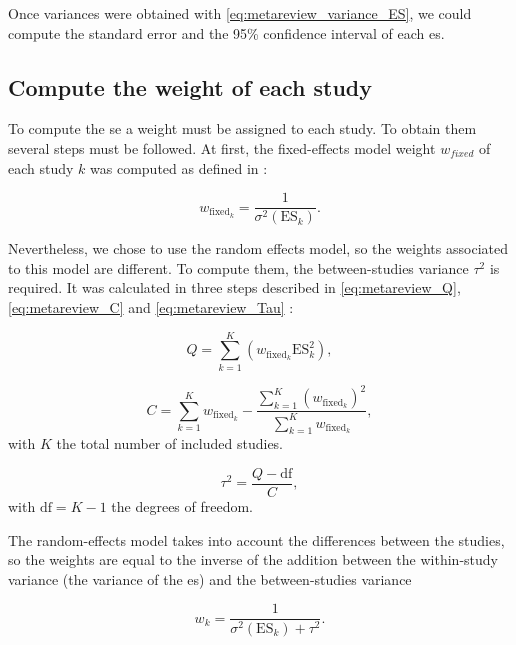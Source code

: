 \documentclass[12pt,a4paper,english]{article}
\begin{document}
Once variances were obtained with \ref{eq:metareview_variance_ES}, we could compute the standard error and the 95\% confidence interval of each \gls{es}. 

\subsection{Compute the weight of each study}

To compute the \gls{se} a weight must be assigned to each study. To obtain them several steps must be followed. At first, the fixed-effects model 
weight $w_{fixed}$ of each study $k$ was computed as defined in \citet{Borenstein2009}: 

\begin{equation}
\label{eq:metareview_weight_fixed_study}
w_{\text{fixed}_k} = \frac{1}{\sigma^2(\text{ES}_k)}.
\end{equation} 

Nevertheless, we chose to use the random effects model, so the weights associated to this model are different. To compute them, the between-studies 
variance $\tau^2$ is required. It was calculated in three steps described in \ref{eq:metareview_Q}, \ref{eq:metareview_C} and \ref{eq:metareview_Tau} 
\citep{Borenstein2009}:

\begin{equation}
\label{eq:metareview_Q}
Q = \sum_{k=1}^{K} (w_{\text{fixed}_k} \text{ES}_k^2),
\end{equation}

\begin{equation}
\label{eq:metareview_C}
C = \sum_{k=1}^{K} w_{\text{fixed}_k} - \frac{ \sum_{k=1}^{K} (w_{\text{fixed}_k})^2 } { \sum_{k=1}^{K} w_{\text{fixed}_k} },
\end{equation}
with $K$ the total number of included studies.

\begin{equation}
\label{eq:metareview_Tau}
\tau^2 = \frac{Q - \text{df}}{C},
\end{equation}
with $\text{df} = K - 1$ the degrees of freedom.

The random-effects model takes into account the differences between the studies, so the weights are equal to the inverse of the addition between the 
within-study variance (the variance of the \gls{es}) and the between-studies variance

\begin{equation}
\label{eq:metareview_weight_study}
w_k = \frac{1}{\sigma^2(\text{ES}_k) + \tau^2}.
\end{equation} 
\end{document}
